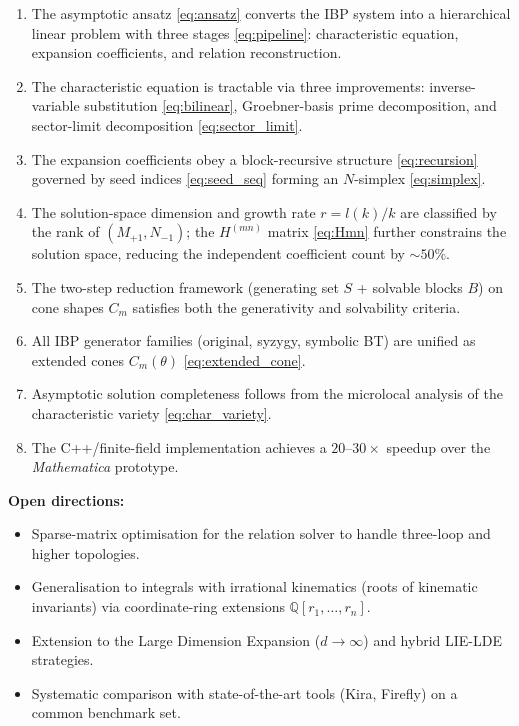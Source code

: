 \documentclass[12pt]{article}
\begin{document}
\begin{enumerate}
  \item The asymptotic ansatz \eqref{eq:ansatz} converts the IBP system into a
        hierarchical linear problem with three stages
        \eqref{eq:pipeline}: characteristic equation, expansion coefficients,
        and relation reconstruction.
  \item The characteristic equation is tractable via three improvements:
        inverse-variable substitution \eqref{eq:bilinear},
        Groebner-basis prime decomposition, and sector-limit decomposition
        \eqref{eq:sector_limit}.
  \item The expansion coefficients obey a block-recursive structure
        \eqref{eq:recursion} governed by seed indices \eqref{eq:seed_seq}
        forming an $N$-simplex \eqref{eq:simplex}.
  \item The solution-space dimension and growth rate $r=l(k)/k$ are classified
        by the rank of $(M_{+1},N_{-1})$; the $H^{(mn)}$ matrix
        \eqref{eq:Hmn} further constrains the solution space, reducing the
        independent coefficient count by $\sim 50\%$.
  \item The two-step reduction framework (generating set $S$ + solvable blocks $B$)
        on cone shapes $C_m$ satisfies both the generativity and solvability
        criteria.
  \item All IBP generator families (original, syzygy, symbolic BT) are unified
        as extended cones $C_m(\theta)$ \eqref{eq:extended_cone}.
  \item Asymptotic solution completeness follows from the microlocal analysis
        of the characteristic variety \eqref{eq:char_variety}.
  \item The C++/finite-field implementation achieves a $20$--$30\times$
        speedup over the \emph{Mathematica} prototype.
\end{enumerate}

\textbf{Open directions:}
\begin{itemize}
  \item Sparse-matrix optimisation for the relation solver to handle
        three-loop and higher topologies.
  \item Generalisation to integrals with irrational kinematics (roots of
        kinematic invariants) via coordinate-ring extensions
        $\mathbb Q[r_1,\ldots,r_n]$.
  \item Extension to the Large Dimension Expansion ($d\to\infty$) and
        hybrid LIE-LDE strategies.
  \item Systematic comparison with state-of-the-art tools (Kira, Firefly)
        on a common benchmark set.
\end{itemize}



\end{document}
